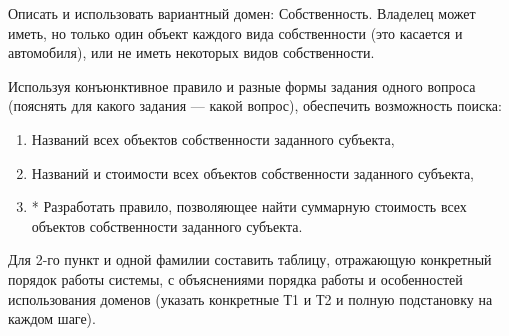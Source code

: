 \documentclass[12pt]{report}
\begin{document}
Описать и использовать вариантный домен: Собственность. Владелец может иметь, но только один объект каждого вида собственности (это касается и автомобиля), или не иметь некоторых видов собственности.

Используя конъюнктивное правило и разные формы задания одного вопроса (пояснять для какого задания --- какой вопрос), обеспечить возможность поиска:

\begin{enumerate}
    \item Названий всех объектов собственности заданного субъекта,
    \item Названий и стоимости всех объектов собственности заданного субъекта,
    \item * Разработать правило, позволяющее найти суммарную стоимость всех
    объектов собственности заданного субъекта.
\end{enumerate}

Для 2-го пункт и одной фамилии составить таблицу, отражающую конкретный
порядок работы системы, с объяснениями порядка работы и особенностей использования доменов (указать конкретные Т1 и Т2 и полную подстановку на каждом шаге).
\end{document}
